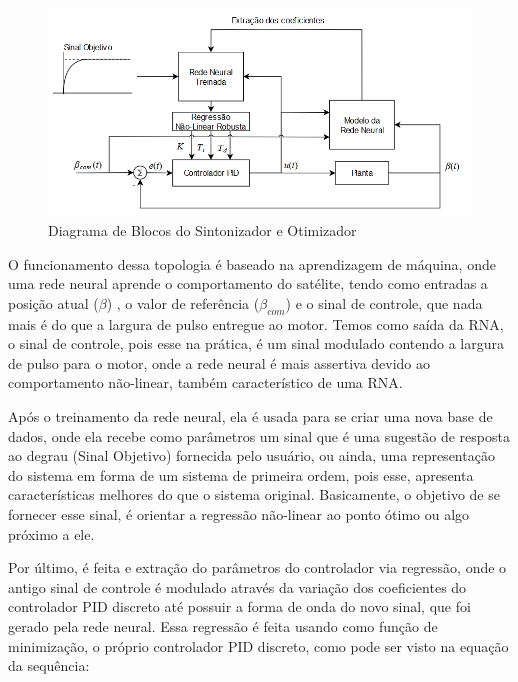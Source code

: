 \begin{figure}[H]
  \caption{Diagrama de Blocos do Sintonizador e Otimizador}
  \begin{center}
      \includegraphics[scale=.65]{metodologia/img/neural_regression}
  \end{center}
  \label{fig:neural_regression}
\end{figure}

O funcionamento dessa topologia é baseado na aprendizagem de máquina, onde uma rede neural aprende o comportamento do satélite, tendo como entradas a posição atual ($\beta$) , o valor de referência ($\beta_{com}$) e o sinal de controle, que nada mais é do que a largura de pulso entregue ao motor. Temos como saída da RNA, o sinal de controle, pois esse na prática, é um sinal modulado contendo a largura de pulso para o motor, onde a rede neural é mais assertiva devido ao comportamento não-linear, também característico de uma RNA.

Após o treinamento da rede neural, ela é usada para se criar uma nova base de dados, onde ela recebe como parâmetros um sinal que é uma sugestão de resposta ao degrau (Sinal Objetivo) fornecida pelo usuário, ou ainda, uma representação do sistema em forma de um sistema de primeira ordem, pois esse, apresenta características melhores do que o sistema original. Basicamente, o objetivo de se fornecer esse sinal, é orientar a regressão não-linear ao ponto ótimo ou algo próximo a ele.

Por último, é feita e extração do parâmetros do controlador via regressão, onde o antigo sinal de controle é modulado através da variação dos coeficientes do controlador PID discreto até possuir a forma de onda do novo sinal, que foi gerado pela rede neural. Essa regressão é feita usando como função de minimização, o próprio controlador PID discreto, como pode ser visto na equação da sequência:

